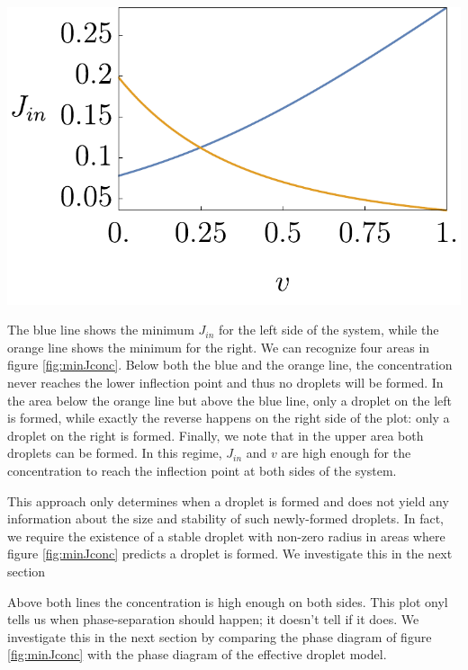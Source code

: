 \documentclass{Dissertate}
\let\origfigure\figure
\let\endorigfigure\endfigure
\renewenvironment{figure}[1][2] {
    \expandafter\origfigure\expandafter[H]
} {
    \endorigfigure
}
\begin{document}
\begin{figure}
\hypertarget{fig:minJconc}{%
\centering
\includegraphics{source/figures/pdf/Jmin.pdf}
\caption{Blue line: Minimum J left side. Orange line: minimum J right
side.}\label{fig:minJconc}
}
\end{figure}

The blue line shows the minimum \(J_{in}\) for the left side of the
system, while the orange line shows the minimum for the right. We can
recognize four areas in figure \ref{fig:minJconc}. Below both the
blue and the orange line, the concentration never reaches the lower
inflection point and thus no droplets will be formed. In the area below
the orange line but above the blue line, only a droplet on the left is
formed, while exactly the reverse happens on the right side of the plot:
only a droplet on the right is formed. Finally, we note that in the
upper area both droplets can be formed. In this regime, \(J_{in}\) and
\(v\) are high enough for the concentration to reach the inflection
point at both sides of the system.

This approach only determines when a droplet is formed and does not
yield any information about the size and stability of such newly-formed
droplets. In fact, we require the existence of a stable droplet with
non-zero radius in areas where figure \ref{fig:minJconc} predicts a
droplet is formed. We investigate this in the next section

Above both lines the concentration is high enough on both sides. This
plot onyl tells us when phase-separation should happen; it doesn't tell
if it does. We investigate this in the next section by comparing the
phase diagram of figure \ref{fig:minJconc} with the phase diagram
of the effective droplet model.
\end{document}
